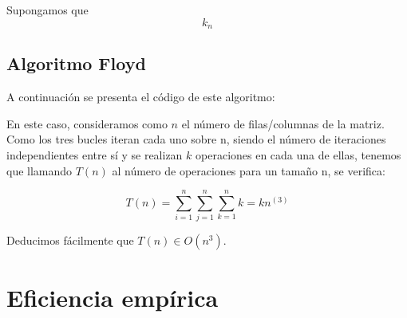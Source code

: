 \documentclass{homework}
\begin{document}
    Supongamos que \[k_{n}\]
        
        
    \subsection{Algoritmo Floyd}

    A continuación se presenta el código de este algoritmo:

    

    En este caso, consideramos como $n$ el número de filas/columnas de la matriz. Como los tres bucles iteran cada uno sobre n, siendo el número de iteraciones
    independientes entre sí y se realizan $k$ operaciones en cada una de ellas, tenemos que llamando $T(n)$ al número de operaciones para un tamaño n, se verifica:
    
    \begin{equation*}
        T(n) = \sum_{i=1}^n \sum_{j=1}^{n} \sum_{k=1}^{n} k = kn^(3)
    \end{equation*}

    Deducimos fácilmente que $T(n) \in O(n^3)$. 

    \section{Eficiencia empírica}


    
\end{document}
